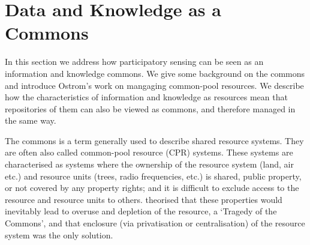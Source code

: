 \section{Data and Knowledge as a Commons}\label{sec:commons}

In this section we address how participatory sensing can be seen as an information and knowledge commons. 
We give some background on the commons and introduce Ostrom's work on mangaging common-pool resources. 
We describe how the characteristics of information and knowledge as resources mean that repositories of them can also be viewed as commons, and therefore managed in the same way. %

The commons is a term generally used to describe shared resource systems. They are often also called common-pool resource (CPR) systems. These systems are characterised as systems where the ownership of the resource system (land, air etc.) and resource units (trees, radio frequencies, etc.) is shared, public property, or not covered by any property rights; and it is difficult to exclude access to the resource and resource units to others. 
\citet{Hardin1968} theorised that these properties would inevitably lead to overuse and depletion of the resource, a `Tragedy of the Commons', and that enclosure (via privatisation or centralisation) of the resource system was the only solution.
